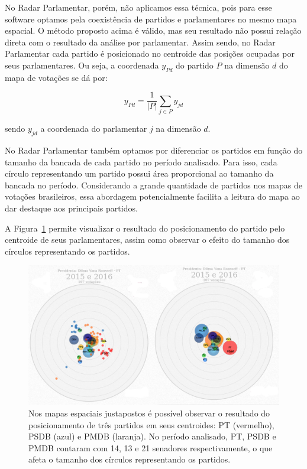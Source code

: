 \documentclass[
	article,			%
	12pt,				%
    twoside,			%
	a4paper,			%
	english,			%
	french,				%
	spanish,			%
	brazil,				%
	]{abntex2}
\begin{document}
No Radar Parlamentar, porém, não aplicamos essa técnica, pois para esse software optamos pela coexistência de partidos e parlamentares no mesmo mapa espacial. O método proposto acima é válido, mas seu resultado não possui relação direta com o resultado da análise por parlamentar. Assim sendo, no Radar Parlamentar cada partido é posicionado no centroide das posições ocupadas por seus parlamentares. Ou seja, a coordenada $y_{Pd}$ do partido $P$ na dimensão $d$ do mapa de votações se dá por:

\begin{equation}
  y_{Pd} = \frac{1}{|P|}\sum_{j\in P}{y_{jd}}
  \label{eq:partido-centroide}
\end{equation}

sendo $y_{jd}$ a coordenada do parlamentar $j$ na dimensão $d$.

No Radar Parlamentar também optamos por diferenciar os partidos em função do tamanho da bancada de cada partido no período analisado. Para isso, cada círculo representando um partido possui área proporcional ao tamanho da bancada no período. Considerando a grande quantidade de partidos nos mapas de votações brasileiros, essa abordagem potencialmente facilita a leitura do mapa ao dar destaque aos principais partidos.

A Figura~\ref{fig:centroide} permite visualizar o resultado do posicionamento do partido pelo centroide de seus parlamentares, assim como observar o efeito do tamanho dos círculos representando os partidos.

\begin{figure}[h]
  \centering
  \includegraphics[scale=0.37]{figs/centroide.png}
  \caption{Nos mapas espaciais justapostos é possível observar o resultado do posicionamento de três partidos em seus centroides: PT (vermelho), PSDB (azul) e PMDB (laranja). No período analisado, PT, PSDB e PMDB contaram com 14, 13 e 21 senadores respectivamente, o que afeta o tamanho dos círculos representando os partidos.}
  \label{fig:centroide}
\end{figure}
\end{document}
